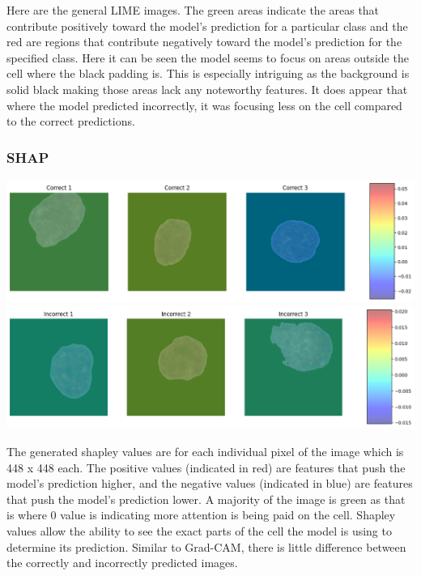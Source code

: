 \documentclass[
	a4paper,
	10pt,
	unnumberedsections,
	twoside,
]{research_article}
\begin{document}
Here are the general LIME images. The green areas indicate the areas that contribute positively toward the model's prediction for a particular class and the red are regions that contribute negatively toward the model's prediction for the specified class. Here it can be seen the model seems to focus on areas outside the cell where the black padding is. This is especially intriguing as the background is solid black making those areas lack any noteworthy features. It does appear that where the model predicted incorrectly, it was focusing less on the cell compared to the correct predictions.

\newpage
\subsubsection{SHAP}

\begin{center}
	\includegraphics[width=\linewidth]{images/dataset1_shap_correct.png}
	\includegraphics[width=\linewidth]{images/dataset1_shap_incorrect.png}
\end{center}

The generated shapley values are for each individual pixel of the image which is 448 x 448 each. The positive values (indicated in red) are features that push the model's prediction higher, and the negative values (indicated in blue) are features that push the model's prediction lower. A majority of the image is green as that is where 0 value is indicating more attention is being paid on the cell. Shapley values allow the ability to see the exact parts of the cell the model is using to determine its prediction. Similar to Grad-CAM, there is little difference between the correctly and incorrectly predicted images.
\end{document}
